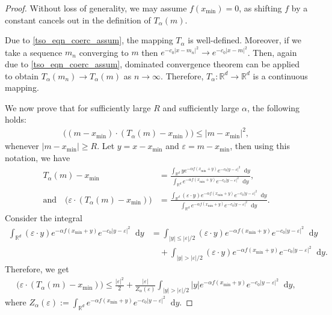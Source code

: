 \documentclass{article}
\newcommand*\der{\mathop{}\!\mathrm{d}}
\numberwithin{equation}{section}
\begin{document}
\begin{proof}
Without loss of generality, we may assume $f(x_{\min}) = 0$, as shifting $f$ by a constant cancels out in the definition of $T_\alpha(m)$.

Due to \eqref{tso_eqn_coerc_assum}, the mapping $T_\alpha$ is well-defined. Moreover, if we take a sequence $m_n $ converging to $m$ then $e^{-c_0 |x - m_n|^2} \to e^{-c_0 |x - m|^2}$. Then, again due to  \eqref{tso_eqn_coerc_assum}, dominated convergence theorem can be applied to obtain $T_\alpha (m_n) \to T_{\alpha}(m) $ as $n \to \infty$. Therefore, $T_\alpha :\mathbb{R}^{d} \to \mathbb{R}^d$ is a continuous mapping. 


We now prove that for sufficiently large $R$ and sufficiently large $\alpha$, the following holds:
\begin{align*}
 \big( ( m - x_{\min}) \cdot (T_\alpha(m) - x_{\min})\big) \leq |m - x_{\min}|^2, 
\end{align*}
whenever $|m - x_{\min}| \geq R$. Let $y = x - x_{\min}$ and $\varepsilon = m - x_{\min}$, then using this notation, we have
\begin{align*}
    T_{\alpha}(m) - x_{\min} &= \frac{\int_{\mathbb{R}^d} y e^{-\alpha f(x_{\min} + y)} e^{-c_0 |y - \varepsilon|^2} \der y}{\int_{\mathbb{R}^d} e^{-\alpha f(x_{\min} + y)} e^{-c_0 |y - \varepsilon|^2} \der y}, \\ 
   \text{and}\quad  \big( \varepsilon \cdot (T_{\alpha}(m) - x_{\min})\big) &= \frac{\int_{\mathbb{R}^d} (\varepsilon \cdot y) e^{-\alpha f(x_{\min} + y)} e^{-c_0 |y - \varepsilon|^2} \der y}{\int_{\mathbb{R}^d} e^{-\alpha f(x_{\min} + y)} e^{-c_0 |y - \varepsilon|^2} \der y}.
\end{align*}
Consider the integral 
\begin{align*}
    \int_{\mathbb{R}^d} (\varepsilon \cdot y) e^{-\alpha f(x_{\min} + y)} e^{-c_0 |y - \varepsilon|^2} \der y & = \int_{|y| \leq |\varepsilon|/2 } (\varepsilon \cdot y) e^{-\alpha f(x_{\min} + y)} e^{-c_0 |y - \varepsilon|^2} \der y \nonumber 
    \\   &   \quad + \int_{|y| > |\varepsilon|/2 } (\varepsilon \cdot y) e^{-\alpha f(x_{\min} + y)} e^{-c_0 |y - \varepsilon|^2} \der y.
\end{align*}
Therefore, we get
\begin{align}\label{tso_eqn_2.7}
     \big( \varepsilon \cdot (T_{\alpha}(m) - x_{\min})\big) \leq  \frac{|\varepsilon|^2}{2 } + \frac{|\varepsilon|}{Z_\alpha(\varepsilon)} \int_{|y| > |\varepsilon|/2 }  |y| e^{-\alpha f(x_{\min} + y)} e^{-c_0 |y - \varepsilon|^2} \der y,
\end{align}
where $Z_\alpha(\varepsilon) := \int_{\mathbb{R}^d} e^{-\alpha f(x_{\min} + y)} e^{-c_0 |y - \varepsilon|^2} \der y $. 



\end{proof}
\end{document}
